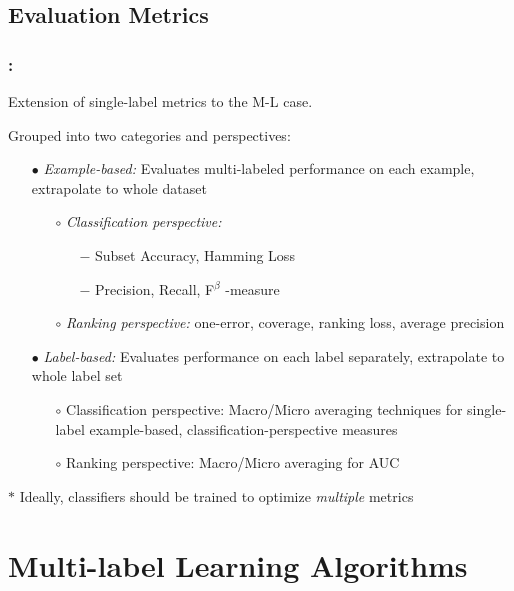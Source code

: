 \documentclass{beamer}
\begin{document}
\subsection{Evaluation Metrics}
\begin{frame}
\frametitle{\insertsection : \insertsubsection}
Extension of single-label metrics to the M-L case.

Grouped into two categories and perspectives:
\begin{itemize}
\item[$\bullet$] \emph{Example-based: }Evaluates multi-labeled performance on each example, extrapolate to whole dataset
\begin{itemize}
\item[$\circ$] \emph{Classification perspective:}
\begin{itemize}
\item[$-$] Subset Accuracy, Hamming Loss
\item[$-$] Precision, Recall,  F$^\beta$ -measure
\end{itemize}
\item[$\circ$] \emph{Ranking perspective:} one-error, coverage, ranking loss, average precision
\end{itemize}
\item[$\bullet$] \emph{Label-based: }Evaluates performance on each label separately, extrapolate to whole label set
\begin{itemize}
\item[$\circ$] Classification perspective: Macro/Micro averaging techniques for single-label example-based, classification-perspective measures
\item[$\circ$] Ranking perspective: Macro/Micro averaging for AUC
\end{itemize}
\end{itemize}
$\ast$ Ideally, classifiers should be trained to optimize \emph{multiple} metrics
\end{frame}
\section{Multi-label Learning Algorithms}
\end{document}
